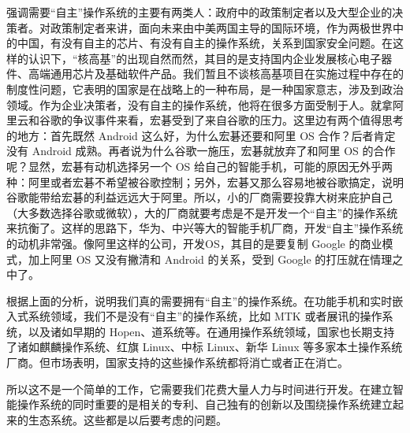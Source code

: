 \documentclass[cs4size,a4paper,nofonts]{ctexart}
\begin{document}
强调需要“自主”操作系统的主要有两类人：政府中的政策制定者以及大型企业的决策者。对政策制定者来讲，面向未来由中美两国主导的国际环境，作为两极世界中的中国，有没有自主的芯片、有没有自主的操作系统，关系到国家安全问题。在这样的认识下，“核高基”的出现自然而然，其目的是支持国内企业发展核心电子器件、高端通用芯片及基础软件产品。我们暂且不谈核高基项目在实施过程中存在的制度性问题，它表明的国家是在战略上的一种布局，是一种国家意志，涉及到政治领域。作为企业决策者，没有自主的操作系统，他将在很多方面受制于人。就拿阿里云和谷歌的争议事件来看，宏碁受到了来自谷歌的压力。这里边有两个值得思考的地方：首先既然 Android 这么好，为什么宏碁还要和阿里 OS 合作？后者肯定没有 Android 成熟。再者说为什么谷歌一施压，宏碁就放弃了和阿里 OS 的合作呢？显然，宏碁有动机选择另一个 OS 给自己的智能手机，可能的原因无外乎两种：阿里或者宏碁不希望被谷歌控制；另外，宏碁又那么容易地被谷歌搞定，说明谷歌能带给宏碁的利益远远大于阿里。所以，小的厂商需要投靠大树来庇护自己（大多数选择谷歌或微软），大的厂商就要考虑是不是开发一个“自主”的操作系统来抗衡了。这样的思路下，华为、中兴等大的智能手机厂商，开发“自主”操作系统的动机非常强。像阿里这样的公司，开发OS，其目的是要复制 Google 的商业模式，加上阿里 OS 又没有撇清和 Android 的关系，受到 Google 的打压就在情理之中了。

根据上面的分析，说明我们真的需要拥有“自主”的操作系统。在功能手机和实时嵌入式系统领域，我们不是没有“自主”的操作系统，比如 MTK 或者展讯的操作系统，以及诸如早期的 Hopen、道系统等。在通用操作系统领域，国家也长期支持了诸如麒麟操作系统、红旗 Linux、中标 Linux、新华 Linux 等多家本土操作系统厂商。但市场表明，国家支持的这些操作系统都将消亡或者正在消亡。

所以这不是一个简单的工作，它需要我们花费大量人力与时间进行开发。在建立智能操作系统的同时重要的是相关的专利、自己独有的创新以及围绕操作系统建立起来的生态系统。这些都是以后要考虑的问题。


\end{document}
